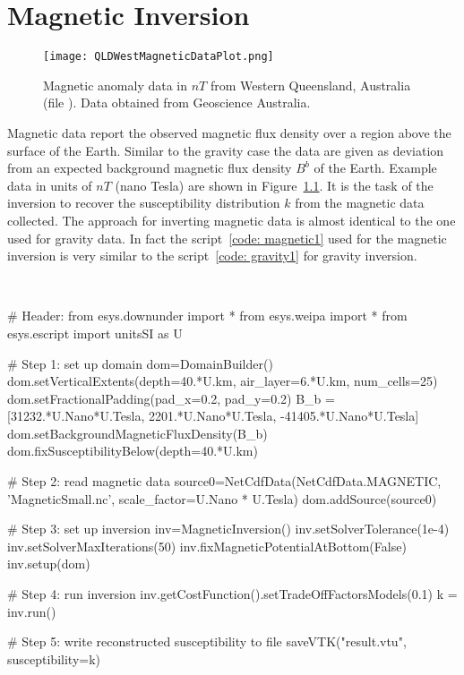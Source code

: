 \chapter{Magnetic Inversion}\label{Chp:cook:magnetic inversion}

\begin{figure}
\centering
\texttt{[image: QLDWestMagneticDataPlot.png]}
\caption{Magnetic anomaly data in $nT$ from Western Queensland, Australia
    (file ). Data obtained from Geoscience Australia.}
\label{FIG:P1:MAG:0}
\end{figure}

Magnetic data report the observed magnetic flux density over a region above the
surface of the Earth.
Similar to the gravity case the data are given as deviation from an expected
background magnetic flux density $B^b$ of the Earth.
Example data in units of $nT$ (nano Tesla) are shown in Figure~\ref{FIG:P1:MAG:0}.
It is the task of the inversion to recover the susceptibility distribution $k$
from the magnetic data collected. The approach for inverting magnetic data is
almost identical to the one used for gravity data. 
In fact the \downunder script~\ref{code: magnetic1} used for the magnetic
inversion is very similar to the script~\ref{code: gravity1} for gravity inversion.

\begin{pyc}\label{code: magnetic1}
\
\begin{python}
# Header:
from esys.downunder import *
from esys.weipa import *
from esys.escript import unitsSI as U


# Step 1: set up domain
dom=DomainBuilder()
dom.setVerticalExtents(depth=40.*U.km, air_layer=6.*U.km, num_cells=25)
dom.setFractionalPadding(pad_x=0.2, pad_y=0.2)
B_b = [31232.*U.Nano*U.Tesla, 2201.*U.Nano*U.Tesla, -41405.*U.Nano*U.Tesla]
dom.setBackgroundMagneticFluxDensity(B_b)
dom.fixSusceptibilityBelow(depth=40.*U.km)

# Step 2: read magnetic data
source0=NetCdfData(NetCdfData.MAGNETIC, 'MagneticSmall.nc', scale_factor=U.Nano * U.Tesla)
dom.addSource(source0)

# Step 3: set up inversion
inv=MagneticInversion()
inv.setSolverTolerance(1e-4)
inv.setSolverMaxIterations(50)
inv.fixMagneticPotentialAtBottom(False)
inv.setup(dom)

# Step 4: run inversion 
inv.getCostFunction().setTradeOffFactorsModels(0.1) 
k = inv.run()

# Step 5: write reconstructed susceptibility to file
saveVTK("result.vtu", susceptibility=k)
\end{python}
\end{pyc}


